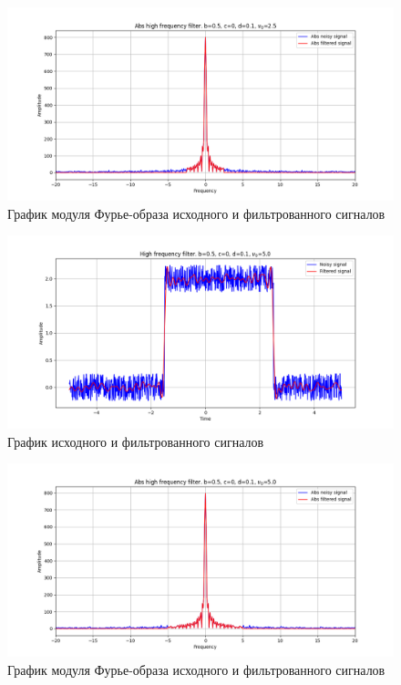 \documentclass[a4paper, 12pt]{article}
\begin{document}
    \begin{figure}[!htb]
        \centering
        \includegraphics[scale=0.485]{13_abs_u_U_nohigh.png}
        \captionsetup{skip=0pt}
        \caption{График модуля Фурье-образа исходного и фильтрованного сигналов}
        \label{fig:fig16}
    \end{figure}
    \begin{figure}[!htb]
        \centering
        \includegraphics[scale=0.485]{8_u_flt_u_nohigh.png}
        \captionsetup{skip=0pt}
        \caption{График исходного и фильтрованного сигналов}
        \label{fig:fig17}
    \end{figure}
    \begin{figure}[!htb]
        \centering
        \includegraphics[scale=0.485]{8_abs_u_U_nohigh.png}
        \captionsetup{skip=0pt}
        \caption{График модуля Фурье-образа исходного и фильтрованного сигналов}
        \label{fig:fig18}
    \end{figure}
\end{document}
